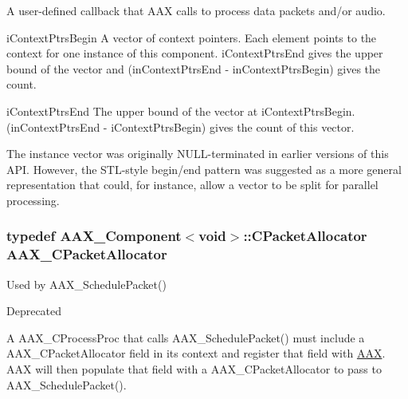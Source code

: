 A user-\/defined callback that A\+A\+X calls to process data packets and/or audio. 

\begin{DoxyParagraph}{i\+Context\+Ptrs\+Begin}
A vector of context pointers. Each element points to the context for one instance of this component. {\ttfamily i\+Context\+Ptrs\+End} gives the upper bound of the vector and {\ttfamily (in\+Context\+Ptrs\+End -\/ in\+Context\+Ptrs\+Begin)} gives the count.
\end{DoxyParagraph}
\begin{DoxyParagraph}{i\+Context\+Ptrs\+End}
The upper bound of the vector at {\ttfamily i\+Context\+Ptrs\+Begin}. {\ttfamily (in\+Context\+Ptrs\+End -\/ i\+Context\+Ptrs\+Begin)} gives the count of this vector.
\end{DoxyParagraph}
The instance vector was originally N\+U\+L\+L-\/terminated in earlier versions of this A\+P\+I. However, the S\+T\+L-\/style begin/end pattern was suggested as a more general representation that could, for instance, allow a vector to be split for parallel processing. \hypertarget{a00163_a5c9c7cdc36d5459fa77e5dedb06d161a}{}
\subsubsection[{A\+A\+X\+\_\+\+C\+Packet\+Allocator}]{\setlength{\rightskip}{0pt plus 5cm}typedef {\bf A\+A\+X\+\_\+\+Component}$<$void$>$\+::C\+Packet\+Allocator {\bf A\+A\+X\+\_\+\+C\+Packet\+Allocator}}\label{a00163_a5c9c7cdc36d5459fa77e5dedb06d161a}


Used by A\+A\+X\+\_\+\+Schedule\+Packet() 

\begin{DoxyRefDesc}{Deprecated}
\item[\hyperlink{a00386__deprecated000002}{Deprecated}]\end{DoxyRefDesc}


A A\+A\+X\+\_\+\+C\+Process\+Proc that calls A\+A\+X\+\_\+\+Schedule\+Packet() must include a A\+A\+X\+\_\+\+C\+Packet\+Allocator field in its context and register that field with \hyperlink{a00288}{A\+A\+X}. A\+A\+X will then populate that field with a A\+A\+X\+\_\+\+C\+Packet\+Allocator to pass to A\+A\+X\+\_\+\+Schedule\+Packet().

